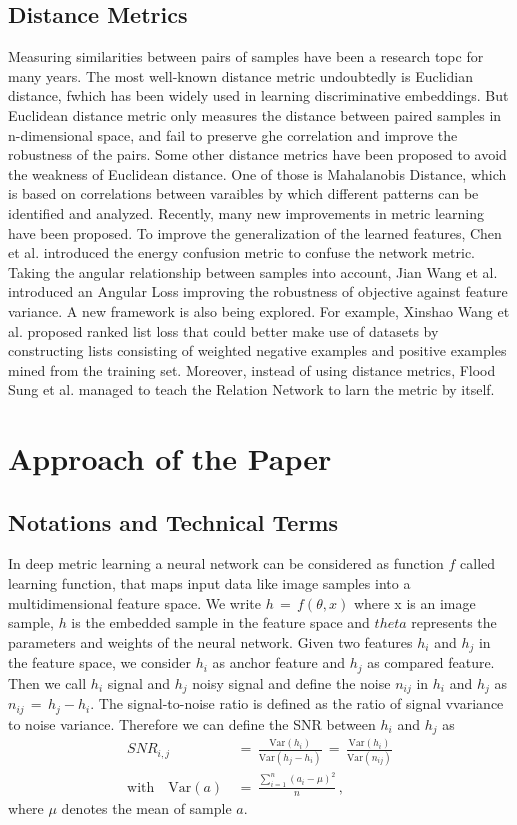 \documentclass[12pt,paper=a4]{scrartcl}
\theoremstyle{break}
\begin{document}
\subsection{Distance Metrics}
Measuring similarities between pairs of samples have been a research topc for many years. The most well-known distance metric undoubtedly is Euclidian distance, fwhich has been widely used in learning discriminative embeddings. But Euclidean distance metric only measures the distance between paired samples in n-dimensional space, and fail to preserve ghe correlation and improve the robustness of the pairs. Some other distance metrics have been proposed to avoid the weakness of Euclidean distance. One of those is Mahalanobis Distance, which is based on correlations between varaibles by which different patterns can be identified and analyzed. Recently, many new improvements in metric learning have been proposed. To improve the generalization of the learned features, Chen et al. introduced the energy confusion metric to confuse the network metric. Taking the angular relationship between samples into account, Jian Wang et al. introduced an Angular Loss improving the robustness of objective against feature variance. A new framework is also being explored. For example, Xinshao Wang et al. proposed ranked list loss that could better make use of datasets by constructing lists consisting of weighted negative examples and positive examples mined from the training set. Moreover, instead of using distance metrics, Flood Sung et al. managed to teach the Relation Network to larn the metric by itself.
\section{Approach of the Paper}
\subsection{Notations and Technical Terms}
In deep metric learning a neural network can be considered as function $f$ called learning function, that maps input data like image samples into a multidimensional feature space. We write $h\, = \, f(\theta, x)$ where x is an image sample, $h$ is the embedded sample in the feature space and $theta$ represents the parameters and weights of the neural network. Given two features $h_i$ and $h_j$ in the feature space, we consider $h_i$ as anchor feature and $h_j$ as compared feature. Then we call $h_i$ signal and $h_j$ noisy signal and define the noise $n_{ij}$ in $h_i$ and $h_j$ as $n_{ij}\,=\,h_j-h_i$. The signal-to-noise ratio is defined as the ratio of signal vvariance to noise variance. Therefore we can define the SNR between $h_i$ and $h_j$ as
\begin{align}
SNR_{i,j}\,&=\,\frac{\mathrm{Var}(h_i)}{\mathrm{Var}(h_j-h_i)}\,=\,\frac{\mathrm{Var}(h_i)}{\mathrm{Var}(n_{ij})} \\
\text{with}\quad \mathrm{Var}(a)\,&=\,\frac{\sum_{i=1}^n(a_i-\mu)^2}{n} \, ,
\end{align}
where $\mu$ denotes the mean of sample $a$.
\end{document}

